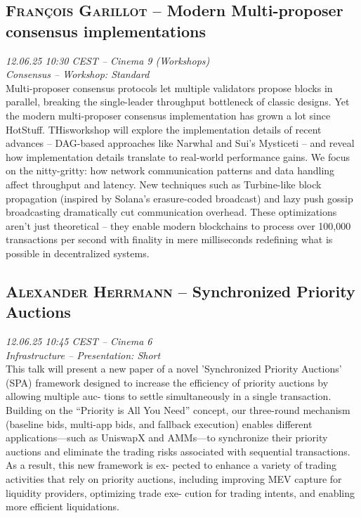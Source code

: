 \subsection {\textsc{François  Garillot}  -- Modern Multi-proposer consensus implementations} \noindent \textit {12.06.25 10:30 CEST -- Cinema 9 (Workshops)\\ Consensus -- Workshop: Standard}\\[1em] Multi-proposer consensus protocols let multiple validators propose blocks in parallel, breaking the single-leader throughput bottleneck of classic designs. Yet the modern multi-proposer consensus implementation has grown a lot since HotStuff. THisworkshop will explore the implementation details of recent advances – DAG-based approaches like Narwhal and Sui’s Mysticeti – and reveal how implementation details translate to real-world performance gains. We focus on the nitty-gritty: how network communication patterns and data handling affect throughput and latency. New techniques such as Turbine-like block propagation (inspired by Solana’s erasure-coded broadcast) and lazy push gossip broadcasting dramatically cut communication overhead. These optimizations aren’t just theoretical – they enable modern blockchains to process over 100,000 transactions per second with finality in mere milliseconds​ redefining what is possible in decentralized systems.

\clearpage
\subsection {\textsc{Alexander Herrmann}  -- Synchronized Priority Auctions} \noindent \textit {12.06.25 10:45 CEST -- Cinema 6\\ Infrastructure -- Presentation: Short}\\[1em] This talk will present a new paper of a novel ’Synchronized Priority Auctions’ (SPA) framework
designed to increase the efficiency of priority auctions by allowing multiple auc-
tions to settle simultaneously in a single transaction. Building on the “Priority
is All You Need” concept, our three-round mechanism (baseline bids, multi-app
bids, and fallback execution) enables different applications—such as UniswapX
and AMMs—to synchronize their priority auctions and eliminate the trading risks
associated with sequential transactions. As a result, this new framework is ex-
pected to enhance a variety of trading activities that rely on priority auctions,
including improving MEV capture for liquidity providers, optimizing trade exe-
cution for trading intents, and enabling more efficient liquidations.

